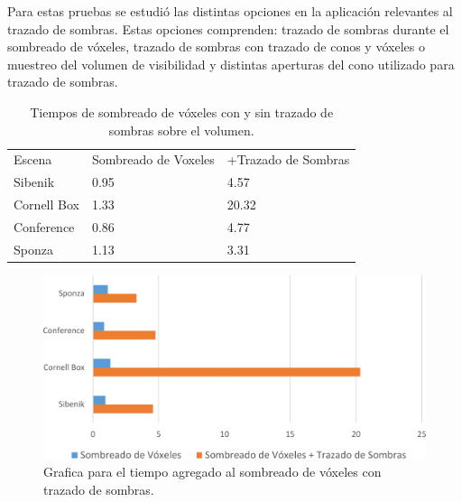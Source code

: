 Para estas pruebas se estudió las distintas opciones en la aplicación relevantes al trazado de sombras. Estas opciones comprenden: trazado de sombras durante el sombreado de vóxeles, trazado de sombras con trazado de conos y vóxeles o muestreo del volumen de visibilidad y distintas aperturas del cono utilizado para trazado de sombras.

\begin{table}[h]
\centering
\begin{tabular}{lll}
                                  &                                           &                                                                \\ \hline
\multicolumn{1}{|l|}{Escena}      & \multicolumn{1}{l|}{Sombreado de Voxeles} & \multicolumn{1}{l|}{+Trazado de Sombras} \\ \hline
\multicolumn{1}{|l|}{Sibenik}     & \multicolumn{1}{l|}{0.95}                 & \multicolumn{1}{l|}{4.57}                                      \\
\multicolumn{1}{|l|}{Cornell Box} & \multicolumn{1}{l|}{1.33}                 & \multicolumn{1}{l|}{20.32}                                     \\
\multicolumn{1}{|l|}{Conference}  & \multicolumn{1}{l|}{0.86}                 & \multicolumn{1}{l|}{4.77}                                      \\
\multicolumn{1}{|l|}{Sponza}      & \multicolumn{1}{l|}{1.13}                 & \multicolumn{1}{l|}{3.31}                                      \\ \hline
\end{tabular}
\caption{Tiempos de sombreado de vóxeles con y sin trazado de sombras sobre el volumen.}
\label{tab:voxelshading_shadowing}
\end{table}

\begin{figure}[h]
	\centering
	\includegraphics[width=0.95\linewidth]{media/voxelshading_shadow_cropped.pdf}
	\caption{Grafica para el tiempo agregado al sombreado de vóxeles con trazado de sombras.}
	\label{fig:voxelshading_shadowing}
\end{figure}

